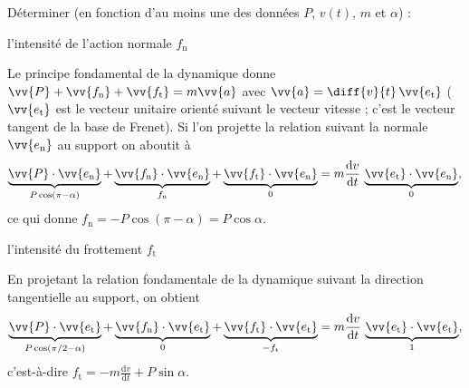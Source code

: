 Déterminer (en fonction d'au moins une des données $P$, $v(t)$, $m$ et $\alpha$) :


\debutEntrainement

\begin{enonce}
l'intensité de l'action normale $f_\text{n}$
\end{enonce}


\begin{corrige}
Le principe fondamental de la dynamique donne $\vv{P}+\vv{f_\text{n}}+\vv{f_\text{t}}=m \vv{a}$ avec $\vv{a}=\diff{v}{t}\,\vv{e_\text{t}}$ ($\vv{e_\text{t}}$ est le vecteur unitaire orienté suivant le vecteur vitesse ; c'est le vecteur tangent de la base de Frenet). Si l'on projette la relation suivant la normale $\vv{e_\text{n}}$ au support on aboutit à 
	\[
		\underbrace{\vv{P}\cdot \vv{e_\text{n}}}_{P\cos(\pi-\alpha)}+
		\underbrace{\vv{f_\text{n}}\cdot \vv{e_\text{n}}}_{f_\text{n}}+
		\underbrace{\vv{f_\text{t}}\cdot \vv{e_\text{n}}}_{0}=
		m \frac{\mathrm{d}v}{\mathrm{d} t}\, \underbrace{\vv{e_\text{t}}\cdot \vv{e_\text{n}}}_{0},
	\]
	ce qui donne $f_\text{n}=-P\cos(\pi-\alpha)=P\cos\alpha$.
\end{corrige}

\begin{enonce}
l'intensité du frottement $f_\text{t}$
\end{enonce}


\begin{corrige}
En projetant la relation fondamentale de la dynamique suivant la direction tangentielle au support, on obtient 
	\[
		\underbrace{\vv{P}\cdot \vv{e_\text{t}}}_{P\cos(\pi/2-\alpha)}+
		\underbrace{\vv{f_\text{n}}\cdot \vv{e_\text{t}}}_{0}+
		\underbrace{\vv{f_\text{t}}\cdot \vv{e_\text{t}}}_{-f_\text{t}}=
		m\frac{\mathrm{d}v}{\mathrm{d} t}\, \underbrace{\vv{e_\text{t}}\cdot \vv{e_\text{t}}}_{1},
	\]
	c'est-à-dire $f_\text{t}=-m \frac{\mathrm{d}v}{\mathrm{d} t}+P\sin\alpha$.
\end{corrige}

